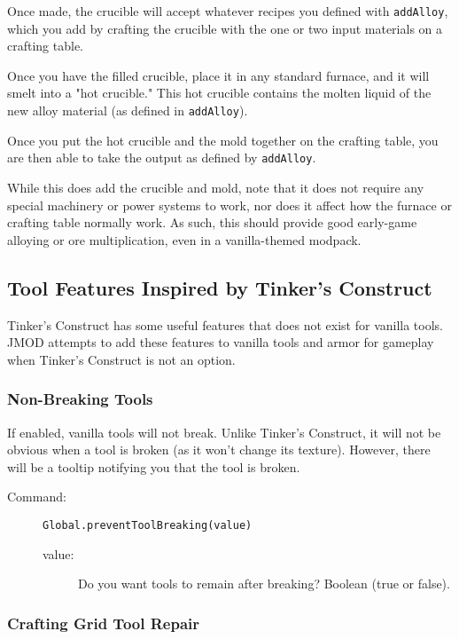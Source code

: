 \documentclass[letterpaper,titlepage,12pt]{article}
\begin{document}
Once made, the crucible will accept whatever recipes you defined with \texttt{addAlloy}, which you add by crafting the crucible with the one or two input materials on a crafting table.

Once you have the filled crucible, place it in any standard furnace, and it will smelt into a "hot crucible."  This hot crucible contains the molten liquid of the new alloy material (as defined in \texttt{addAlloy}).

Once you put the hot crucible and the mold together on the crafting table, you are then able to take the output as defined by \texttt{addAlloy}.

While this does add the crucible and mold, note that it does not require any special machinery or power systems to work, nor does it affect how the furnace or crafting table normally work.  As such, this should provide good early-game alloying or ore multiplication, even in a vanilla-themed modpack.

\subsection{Tool Features Inspired by Tinker's Construct}

Tinker's Construct has some useful features that does not exist for vanilla tools.  JMOD attempts to add these features to vanilla tools and armor for gameplay when Tinker's Construct is not an option.

\subsubsection{Non-Breaking Tools}

If enabled, vanilla tools will not break.  Unlike Tinker's Construct, it will not be obvious when a tool is broken (as it won't change its texture).  However, there will be a tooltip notifying you that the tool is broken.

\begin{description}
\item[Command:] \texttt{Global.preventToolBreaking(value)}
\begin{description}
\item [value:] Do you want tools to remain after breaking?  Boolean (true or false).
\end{description}
\end{description}

\subsubsection{Crafting Grid Tool Repair}
\end{document}
